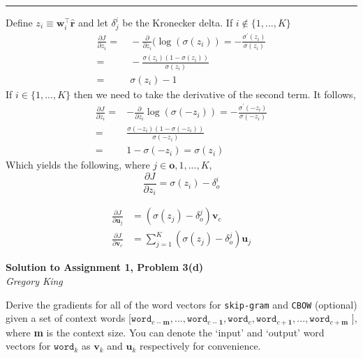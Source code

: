 \documentclass[letter,12pt]{article}
\newcommand{\myhwtitle}[3]
{\begin{center}
{\large {\bf Solution to Assignment {#1}, Problem {#2}}}\\
\medskip 
{\it {#3}} %
\end{center}}
\begin{document}
\noindent\rule{\textwidth}{0.4pt}\vspace{5mm}
Define $z_{i} \equiv {\boldsymbol w}^{\top}_{i}\hat{\boldsymbol r}$ and let $\delta^{i}_{j}$ be the Kronecker delta. If $i \notin \{1,...,K\}$
\begin{align}
\frac{\partial J}{\partial{z_{i}}} =& ~-\frac{\partial}{\partial{z_{i}}}(\log(\sigma(z_{i})) = -\frac{\sigma^{\prime}(z_{i})}{\sigma(z_{i})} \\
                                   =& ~-\frac{\sigma(z_{i})(1 - \sigma(z_{i}))}{\sigma(z_{i})} \\
                                   =& ~\sigma(z_{i}) - 1
\end{align}
If $i \in \{1,...,K\}$ then we need to take the derivative of the second term. It follows,
\begin{align}
\frac{\partial J}{\partial{z_{i}}} =& -\frac{\partial}{\partial{z_{i}}}\log(\sigma(-z_{i})) = -\frac{\sigma^{\prime}(-z_{i})}{\sigma(-z_{i})}\\
                                   =&  \frac{\sigma(-z_{i})(1 - \sigma(-z_{i}))}{\sigma(-z_{i})} \\
                                   =& 1 - \sigma(-z_{i}) = \sigma(z_{i})
\end{align}
Which yields the following, where $j\in{{\boldsymbol o},1,...,K}$,
\begin{equation*}
\frac{\partial{J}}{\partial{z_{i}}} = \sigma(z_{i}) - \delta^{i}_{o}
\end{equation*}

\begin{align}
\frac{\partial J}{\partial{\boldsymbol u}_{j}} &= (\sigma(z_{j}) - \delta^{j}_{o}){\boldsymbol v}_{c}\\
\frac{\partial J}{\partial{\boldsymbol v}_{c}} &= \sum^{K}_{j=1}(\sigma(z_{j}) - \delta^{j}_{o}){\boldsymbol u}_{j}
\end{align}

\clearpage
\myhwtitle{1}{3(d)}{Gregory King}
\bigskip
\noindent Derive the gradients for all of the word vectors for \texttt{skip-gram} and \texttt{CBOW} (optional)
given a set of context words [$\texttt{word}_{c-\textbf{m}},...,\texttt{word}_{c-\textbf{1}},\texttt{word}_{c},\texttt{word}_{c+\textbf{1}},...,\texttt{word}_{c+\textbf{m}}$ ], where \textbf{m} is the context size. You can denote 
the `input' and `output' word vectors for $\texttt{word}_{k}$ as ${\boldsymbol v}_{k}$ and ${\boldsymbol u}_{k}$ respectively for
convenience. \\
\end{document}
